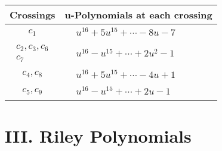 \documentclass[1p]{elsarticle_modified}
\theoremstyle{definition}
\begin{document}
\begin{tabular}{m{50pt}|m{274pt}}
Crossings & \hspace{64pt}u-Polynomials at each crossing \\
\hline $$\begin{aligned}c_{1}\end{aligned}$$&$\begin{aligned}
&u^{16}+5 u^{15}+\cdots-8 u-7
\end{aligned}$\\
\hline $$\begin{aligned}c_{2},c_{3},c_{6}\\c_{7}\end{aligned}$$&$\begin{aligned}
&u^{16}- u^{15}+\cdots+2 u^2-1
\end{aligned}$\\
\hline $$\begin{aligned}c_{4},c_{8}\end{aligned}$$&$\begin{aligned}
&u^{16}+5 u^{15}+\cdots-4 u+1
\end{aligned}$\\
\hline $$\begin{aligned}c_{5},c_{9}\end{aligned}$$&$\begin{aligned}
&u^{16}- u^{15}+\cdots+2 u-1
\end{aligned}$\\
\hline
\end{tabular}\newpage\renewcommand{\arraystretch}{1}
\centering \section*{ III. Riley Polynomials}
\end{document}
